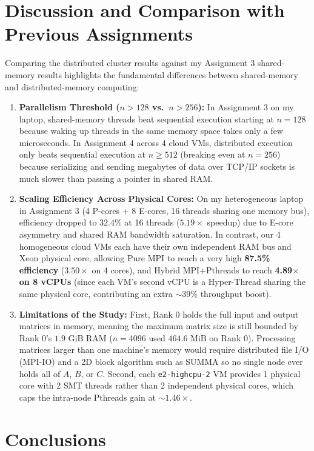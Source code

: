 \documentclass[11pt,a4paper]{article}
\begin{document}
\section{Discussion and Comparison with Previous Assignments}

Comparing the distributed cluster results against my Assignment 3 shared-memory results highlights the fundamental differences between shared-memory and distributed-memory computing:

\begin{enumerate}
    \item \textbf{Parallelism Threshold ($n > 128$ vs.\ $n > 256$):} In Assignment 3 on my laptop, shared-memory threads beat sequential execution starting at $n = 128$ because waking up threads in the same memory space takes only a few microseconds. In Assignment 4 across 4 cloud VMs, distributed execution only beats sequential execution at $n \ge 512$ (breaking even at $n = 256$) because serializing and sending megabytes of data over TCP/IP sockets is much slower than passing a pointer in shared RAM.
    \item \textbf{Scaling Efficiency Across Physical Cores:} On my heterogeneous laptop in Assignment 3 (4 P-cores + 8 E-cores, 16 threads sharing one memory bus), efficiency dropped to $32.4\%$ at 16 threads ($5.19\times$ speedup) due to E-core asymmetry and shared RAM bandwidth saturation. In contrast, our 4 homogeneous cloud VMs each have their own independent RAM bus and Xeon physical core, allowing Pure MPI to reach a very high \textbf{87.5\% efficiency} ($3.50\times$ on 4 cores), and Hybrid MPI+Pthreads to reach \textbf{4.89$\times$ on 8 vCPUs} (since each VM's second vCPU is a Hyper-Thread sharing the same physical core, contributing an extra $\sim 39\%$ throughput boost).
    \item \textbf{Limitations of the Study:} First, Rank 0 holds the full input and output matrices in memory, meaning the maximum matrix size is still bounded by Rank 0's $1.9\text{ GiB}$ RAM ($n = 4096$ used $464.6\text{ MiB}$ on Rank 0). Processing matrices larger than one machine's memory would require distributed file I/O (MPI-IO) and a 2D block algorithm such as SUMMA so no single node ever holds all of $A$, $B$, or $C$. Second, each \texttt{e2-highcpu-2} VM provides 1 physical core with 2 SMT threads rather than 2 independent physical cores, which caps the intra-node Pthreads gain at $\sim 1.46\times$.
\end{enumerate}

\section{Conclusions}
\end{document}
